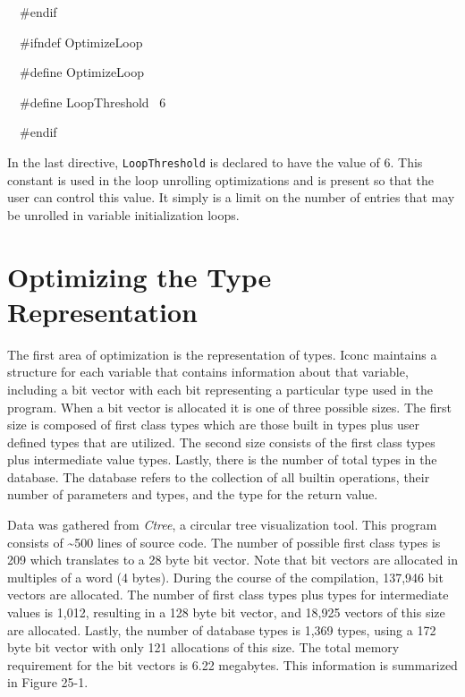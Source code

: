 {\ttfamily\mdseries
\ \ \#endif}


\bigskip

{\ttfamily\mdseries
\ \ \#ifndef OptimizeLoop}

{\ttfamily\mdseries
\ \ \#define OptimizeLoop}

{\ttfamily\mdseries
\ \ \#define LoopThreshold \ 6}

{\ttfamily\mdseries
\ \ \#endif}


In the last directive, \texttt{LoopThreshold} is declared to have the
value of 6. This constant is used in the loop unrolling optimizations
and is present so that the user can control this value. It simply is a
limit on the number of entries that may be unrolled in variable
initialization loops.


\section{Optimizing the Type Representation}

The first area of optimization is the representation of types. Iconc
maintains a structure for each variable that contains information
about that variable, including a bit vector with each bit representing
a particular type used in the program. When a bit vector is allocated
it is one of three possible sizes. The first size is composed of first
class types which are those built in types plus user defined types
that are utilized. The second size consists of the first class types
plus intermediate value types. Lastly, there is the number of total
types in the database. The database refers to the collection of all
builtin operations, their number of parameters and types, and the type
for the return value.

Data was gathered from \textit{Ctree}, a circular tree visualization
tool. This program consists of \~{}500 lines of source code. The
number of possible first class types is 209 which translates to a 28
byte bit vector. Note that bit vectors are allocated in multiples of a
word (4 bytes). During the course of the compilation, 137,946 bit
vectors are allocated. The number of first class types plus types for
intermediate values is 1,012, resulting in a 128 byte bit vector, and
18,925 vectors of this size are allocated. Lastly, the number of
database types is 1,369 types, using a 172 byte bit vector with only
121 allocations of this size. The total memory requirement for the bit
vectors is 6.22 megabytes. This information is summarized in Figure
25-1.

